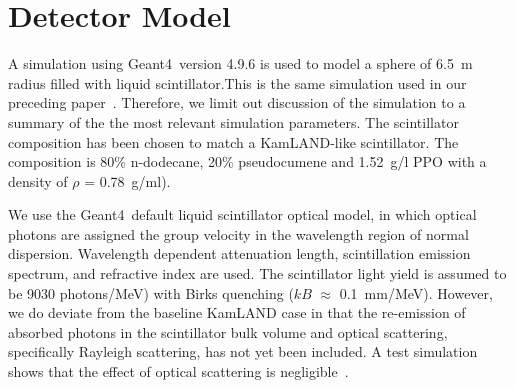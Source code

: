 \section{Detector Model}
\label{sec:detector_description}

A simulation using Geant4~version 4.9.6  is used to model a sphere of 6.5~m radius filled with
liquid scintillator\cite{geant4one,geant4two}.This is the same simulation used in our preceding paper~\cite{Aberle2014}. Therefore, we limit out discussion of the simulation to a summary of the the most relevant simulation parameters.  The scintillator composition has been chosen to match a KamLAND-like scintillator\cite{kamland2003}. The composition is 80\% n-dodecane, 20\% pseudocumene and 1.52~g/l PPO with a density of $\rho$ = 0.78~g/ml).

We use the Geant4~default liquid scintillator optical model, in which optical photons are assigned the group velocity in the wavelength region of normal dispersion. Wavelength dependent attenuation length\cite{tajimaMaster}, scintillation emission spectrum\cite{tajimaMaster}, and refractive index\cite{OlegThesis} are used. The scintillator light yield is assumed to be 9030 photons/MeV) with Birks quenching  ($kB$ $\approx$ 0.1~mm/MeV)\cite{ChrisThesis}. However, we do deviate from the baseline KamLAND case in that the re-emission of absorbed photons in the scintillator bulk volume and optical scattering, specifically Rayleigh scattering, has not yet been included. A test simulation shows that the effect of optical scattering is negligible~\cite{Aberle2014}.


